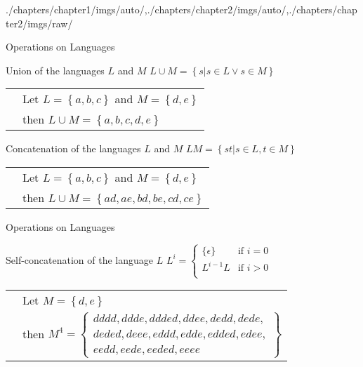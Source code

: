 \begin{graphicspathcontext}{{./chapters/chapter1/imgs/auto/},{./chapters/chapter2/imgs/auto/},{./chapters/chapter2/imgs/raw/}}
\begin{bibunit}[apalike]
\begin{frame}{Operations on Languages}
	\vspace{1cm}
	\begin{block}{Union of the languages $L$ and $M$}
		$L \cup M = \left\{s | s\in L \vee s \in M\right\}$
		\begin{tabularx}{\linewidth}{@{}lX@{}}
		\insertexamplelabel & Let $L = \left\{ a, b ,c \right\}$ and $M = \left\{ d, e \right\}$ \\
		& then $L \cup M = \left\{ a, b, c, d, e \right\}$
		\end{tabularx}
	\end{block}
	\vspace{.5cm}
	\begin{block}{Concatenation of the languages $L$ and $M$}
		$LM = \left\{st | s\in L, t \in M\right\}$
		\begin{tabularx}{\linewidth}{@{}lX@{}}
		\insertexamplelabel & Let $L = \left\{ a, b ,c \right\}$ and $M = \left\{ d, e \right\}$ \\
		& then $L \cup M = \left\{ ad, ae, bd, be, cd, ce \right\}$
		\end{tabularx}
	\end{block}
\end{frame}

\begin{frame}{Operations on Languages \insertcontinuationtext}
	\begin{block}{Self-concatenation of the language $L$}
		$L^i = \begin{cases}
			\{\epsilon\} & \text{if }i=0 \\
			L^{i-1}L & \text{if }i>0 \\
			\end{cases}$
		\begin{tabularx}{\linewidth}{@{}lX@{}}
		\insertexamplelabel & Let $M = \left\{ d, e \right\}$ \\
		& then $M^4 = \left\{ \begin{array}{l}
			\scriptstyle dddd, ddde, ddded, ddee, dedd, dede, \\
			\scriptstyle deded, deee, eddd, edde, edded, edee, \\
			\scriptstyle eedd, eede, eeded, eeee \end{array} \right\}$
		\end{tabularx}
	\end{block}
\end{frame}


\end{bibunit}
\end{graphicspathcontext}
